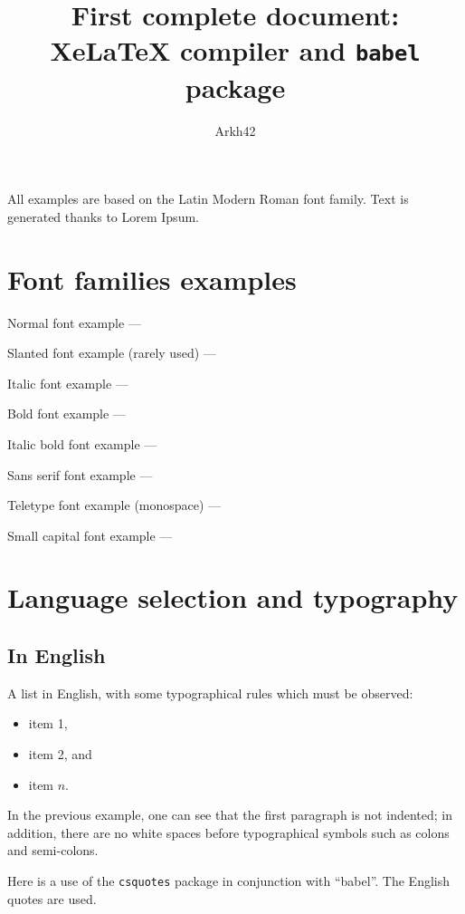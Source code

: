 \documentclass[11pt, a4paper, english]{article}
\author{Arkh42}
\title{First complete document: Xe\LaTeX{} compiler and \texttt{babel} package}
\begin{document}
	
	
	\maketitle
	
	
	All examples are based on the Latin Modern Roman font family.
	Text is generated thanks to Lorem Ipsum.
	
	
	\section{Font families examples}
	
		Normal font example --- \lipsum[1]
		
		Slanted font example (rarely used) --- \textsl{\lipsum[1]}
		
		Italic font example --- \textit{\lipsum[1]}
		
		Bold font example --- \textbf{\lipsum[1]}
		
		Italic bold font example --- \textbf{\textit{\lipsum[1]}}
		
		Sans serif font example --- \textsf{\lipsum[1]}
		
		Teletype font example (monospace) --- \texttt{\lipsum[1]}
		
		Small capital font example --- \textsc{\lipsum[1]}
	
	
	\section{Language selection and typography}
	
	
		\subsection{In English}
		
			A list in English, with some typographical rules which must be observed:
			\begin{itemize}
				\item item 1,
				\item item 2, and
				\item item $n$.
			\end{itemize}
			
			In the previous example, one can see that the first paragraph is not indented; in addition, there are no white spaces before typographical symbols such as colons and semi-colons.
			
			Here is a use of the \texttt{csquotes} package in conjunction with \enquote{babel}. The English quotes are used. 
		
\end{document}
